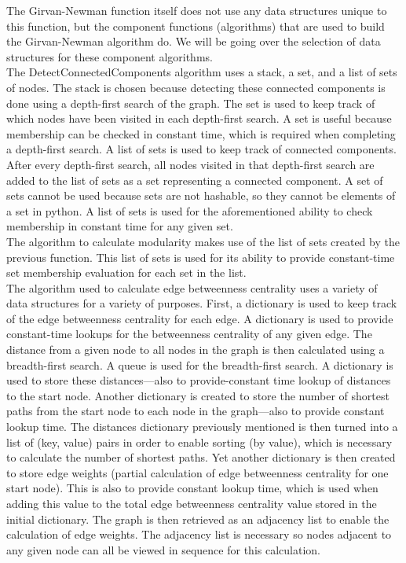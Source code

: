 \documentclass{article}
\begin{document}
The Girvan-Newman function itself does not use any data structures unique to this function, but the component functions (algorithms) that are used to build the Girvan-Newman algorithm do.  We will be going over the selection of data structures for these component algorithms. \\

The DetectConnectedComponents algorithm uses a stack, a set, and a list of sets of nodes.  The stack is chosen because detecting these connected components is done using a depth-first search of the graph.  The set is used to keep track of which nodes have been visited in each depth-first search.  A set is useful because membership can be checked in constant time, which is required when completing a depth-first search.  A list of sets is used to keep track of connected components.  After every depth-first search, all nodes visited in that depth-first search are added to the list of sets as a set representing a connected component.  A set of sets cannot be used because sets are not hashable, so they cannot be elements of a set in python.  A list of sets is used for the aforementioned ability to check membership in constant time for any given set. \\

The algorithm to calculate modularity makes use of the list of sets created by the previous function.  This list of sets is used for its ability to provide constant-time set membership evaluation for each set in the list. \\

The algorithm used to calculate edge betweenness centrality uses a variety of data structures for a variety of purposes.  First, a dictionary is used to keep track of the edge betweenness centrality for each edge.  A dictionary is used to provide constant-time lookups for the betweenness centrality of any given edge.  The distance from a given node to all nodes in the graph is then calculated using a breadth-first search.  A queue is used for the breadth-first search.  A dictionary is used to store these distances---also to provide-constant time lookup of distances to the start node.  Another dictionary is created to store the number of shortest paths from the start node to each node in the graph---also to provide constant lookup time.  The distances dictionary previously mentioned is then turned into a list of (key, value) pairs in order to enable sorting (by value), which is necessary to calculate the number of shortest paths.  Yet another dictionary is then created to store edge weights (partial calculation of edge betweenness centrality for one start node).  This is also to provide constant lookup time, which is used when adding this value to the total edge betweenness centrality value stored in the initial dictionary.  The graph is then retrieved as an adjacency list to enable the calculation of edge weights.  The adjacency list is necessary so nodes adjacent to any given node can all be viewed in sequence for this calculation.
\end{document}

